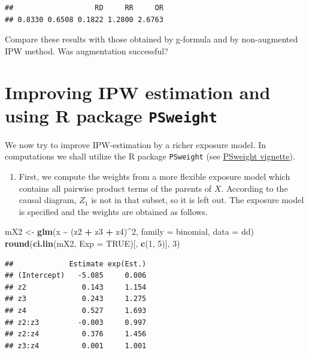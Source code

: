 \documentclass[
]{book}
\newenvironment{Shaded}{\begin{snugshade}}{\end{snugshade}}
\newcommand{\AttributeTok}[1]{\textcolor[rgb]{0.13,0.29,0.53}{#1}}
\newcommand{\ConstantTok}[1]{\textcolor[rgb]{0.56,0.35,0.01}{#1}}
\newcommand{\DecValTok}[1]{\textcolor[rgb]{0.00,0.00,0.81}{#1}}
\newcommand{\FunctionTok}[1]{\textcolor[rgb]{0.13,0.29,0.53}{\textbf{#1}}}
\newcommand{\NormalTok}[1]{#1}
\newcommand{\OtherTok}[1]{\textcolor[rgb]{0.56,0.35,0.01}{#1}}
\newcommand{\SpecialCharTok}[1]{\textcolor[rgb]{0.81,0.36,0.00}{\textbf{#1}}}
\providecommand{\tightlist}{%
  \setlength{\itemsep}{0pt}\setlength{\parskip}{0pt}}
\begin{document}
\begin{verbatim}
##                   RD     RR     OR 
## 0.8330 0.6508 0.1822 1.2800 2.6763
\end{verbatim}

Compare these results with those obtained by g-formula and by
non-augmented IPW method. Was augmentation successful?

\section{\texorpdfstring{Improving IPW estimation and using R package \texttt{PSweight}}{Improving IPW estimation and using R package PSweight}}\label{improving-ipw-estimation-and-using-r-package-psweight}

We now try to improve IPW-estimation by a richer exposure model. In
computations we shall utilize the R package \texttt{PSweight} (see \href{https://cran.r-project.org/web/packages/PSweight/vignettes/vignette.pdf}{PSweight
vignette}).

\begin{enumerate}
\def\labelenumi{\arabic{enumi}.}
\tightlist
\item
  First, we compute the weights from a more flexible exposure model
  which contains all pairwise product terms of the parents of \(X\).
  According to the causal diagram, \(Z_1\) is not in that subset, so it
  is left out. The exposure model is specified and the weights are
  obtained as follows.
\end{enumerate}

\begin{Shaded}
\begin{Highlighting}[]
\NormalTok{mX2 }\OtherTok{\textless{}{-}} \FunctionTok{glm}\NormalTok{(x }\SpecialCharTok{\textasciitilde{}}\NormalTok{ (z2 }\SpecialCharTok{+}\NormalTok{ z3 }\SpecialCharTok{+}\NormalTok{ z4)}\SpecialCharTok{\^{}}\DecValTok{2}\NormalTok{, }\AttributeTok{family =}\NormalTok{ binomial, }\AttributeTok{data =}\NormalTok{ dd)}
\FunctionTok{round}\NormalTok{(}\FunctionTok{ci.lin}\NormalTok{(mX2, }\AttributeTok{Exp =} \ConstantTok{TRUE}\NormalTok{)[, }\FunctionTok{c}\NormalTok{(}\DecValTok{1}\NormalTok{, }\DecValTok{5}\NormalTok{)], }\DecValTok{3}\NormalTok{)}
\end{Highlighting}
\end{Shaded}

\begin{verbatim}
##             Estimate exp(Est.)
## (Intercept)   -5.085     0.006
## z2             0.143     1.154
## z3             0.243     1.275
## z4             0.527     1.693
## z2:z3         -0.003     0.997
## z2:z4          0.376     1.456
## z3:z4          0.001     1.001
\end{verbatim}
\end{document}
